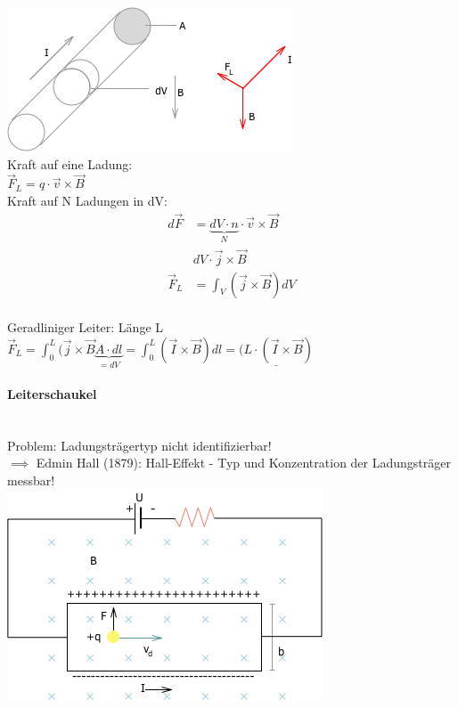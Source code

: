         \includegraphics[width=0.7\linewidth]{skizzen/16/16_1B07}\\
        
        Kraft auf eine Ladung:\\
        $\vec{F}_L=q\cdot \vec{v}\times\vec{B}$\\
        
        Kraft auf N Ladungen in dV:\\
        \begin{align}
        	d\vec{F}&= \underbrace{dV\cdot n}_{N}\cdot \vec{v}\times\vec{B}\\
        	&dV\cdot\vec{j}\times\vec{B}\\
        	\vec{F}_L&=\int_V(\vec{j}\times\vec{B})dV
        \end{align}\\
        
        Geradliniger Leiter: Länge L\\
        
        $\vec{F}_L=\int_0^L(\vec{j}\times\vec{B}\underbrace{A\cdot dl}_{=dV}=\int_0^L(\vec{I}\times\vec{B})dl=\underline{(L\cdot(\vec{I}\times\vec{B})}$\\
        
        \paragraph{Leiterschaukel}\leavevmode \\
        Problem: Ladungsträgertyp nicht identifizierbar!\\
        $\implies$ Edmin Hall (1879): Hall-Effekt - Typ und Konzentration der Ladungsträger messbar!\\
        
        \includegraphics[width=0.7\linewidth]{skizzen/16/16_1B08}\\
        
